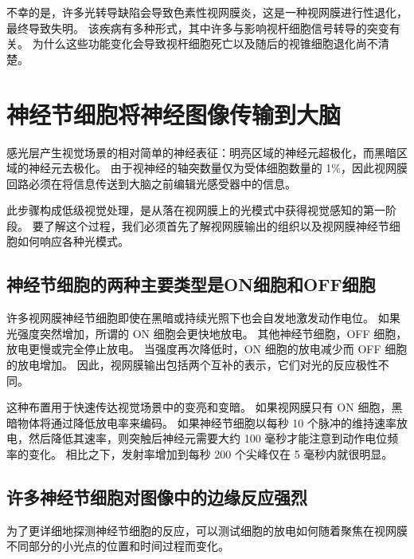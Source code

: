 不幸的是，许多光转导缺陷会导致色素性视网膜炎，这是一种视网膜进行性退化，最终导致失明。
该疾病有多种形式，其中许多与影响视杆细胞信号转导的突变有关。
为什么这些功能变化会导致视杆细胞死亡以及随后的视锥细胞退化尚不清楚。



\section{神经节细胞将神经图像传输到大脑}

感光层产生视觉场景的相对简单的神经表征：明亮区域的神经元超极化，而黑暗区域的神经元去极化。
由于视神经的轴突数量仅为受体细胞数量的 1\%，因此视网膜回路必须在将信息传送到大脑之前编辑光感受器中的信息。


此步骤构成低级视觉处理，是从落在视网膜上的光模式中获得视觉感知的第一阶段。
要了解这个过程，我们必须首先了解视网膜输出的组织以及视网膜神经节细胞如何响应各种光模式。



\subsection{神经节细胞的两种主要类型是ON细胞和OFF细胞}

许多视网膜神经节细胞即使在黑暗或持续光照下也会自发地激发动作电位。
如果光强度突然增加，所谓的 ON 细胞会更快地放电。
其他神经节细胞，OFF 细胞，放电更慢或完全停止放电。
当强度再次降低时，ON 细胞的放电减少而 OFF 细胞的放电增加。
因此，视网膜输出包括两个互补的表示，它们对光的反应极性不同。


这种布置用于快速传达视觉场景中的变亮和变暗。
如果视网膜只有 ON 细胞，黑暗物体将通过降低放电率来编码。
如果神经节细胞以每秒 10 个脉冲的维持速率放电，然后降低其速率，则突触后神经元需要大约 100 毫秒才能注意到动作电位频率的变化。
相比之下，发射率增加到每秒 200 个尖峰仅在 5 毫秒内就很明显。



\subsection{许多神经节细胞对图像中的边缘反应强烈}

为了更详细地探测神经节细胞的反应，可以测试细胞的放电如何随着聚焦在视网膜不同部分的小光点的位置和时间过程而变化。


